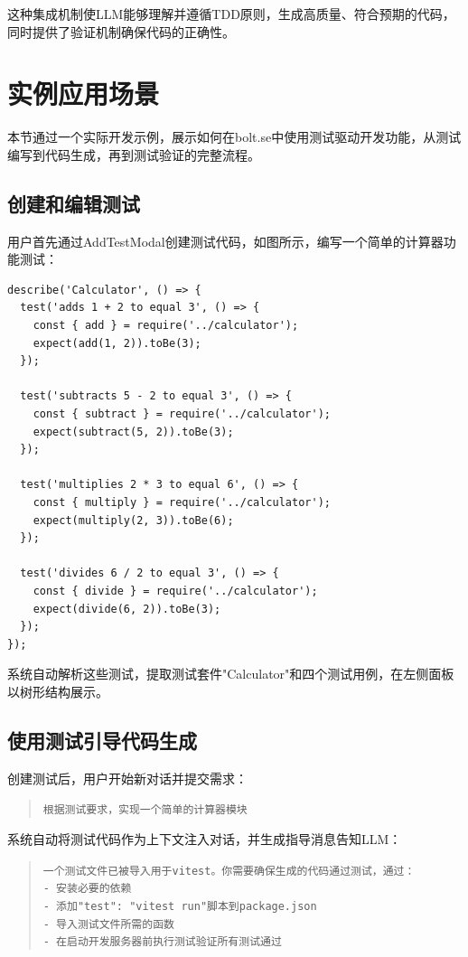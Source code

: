 这种集成机制使LLM能够理解并遵循TDD原则，生成高质量、符合预期的代码，同时提供了验证机制确保代码的正确性。

\section{实例应用场景}

本节通过一个实际开发示例，展示如何在bolt.se中使用测试驱动开发功能，从测试编写到代码生成，再到测试验证的完整流程。

\subsection{创建和编辑测试}

用户首先通过AddTestModal创建测试代码，如图所示，编写一个简单的计算器功能测试：

\begin{verbatim}
describe('Calculator', () => {
  test('adds 1 + 2 to equal 3', () => {
    const { add } = require('../calculator');
    expect(add(1, 2)).toBe(3);
  });
  
  test('subtracts 5 - 2 to equal 3', () => {
    const { subtract } = require('../calculator');
    expect(subtract(5, 2)).toBe(3);
  });
  
  test('multiplies 2 * 3 to equal 6', () => {
    const { multiply } = require('../calculator');
    expect(multiply(2, 3)).toBe(6);
  });
  
  test('divides 6 / 2 to equal 3', () => {
    const { divide } = require('../calculator');
    expect(divide(6, 2)).toBe(3);
  });
});
\end{verbatim}

系统自动解析这些测试，提取测试套件"Calculator"和四个测试用例，在左侧面板以树形结构展示。

\subsection{使用测试引导代码生成}

创建测试后，用户开始新对话并提交需求：

\begin{quote}
\texttt{根据测试要求，实现一个简单的计算器模块}
\end{quote}

系统自动将测试代码作为上下文注入对话，并生成指导消息告知LLM：

\begin{quote}
\texttt{一个测试文件已被导入用于vitest。你需要确保生成的代码通过测试，通过：\\
- 安装必要的依赖\\
- 添加"test": "vitest run"脚本到package.json\\
- 导入测试文件所需的函数\\
- 在启动开发服务器前执行测试验证所有测试通过}
\end{quote}

